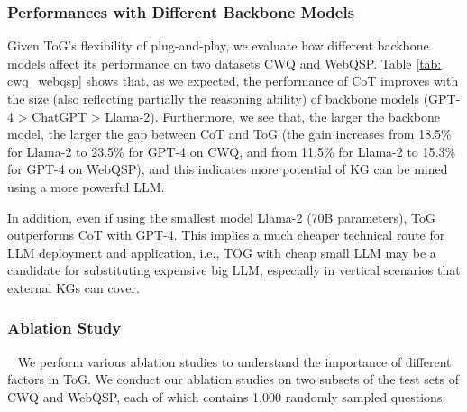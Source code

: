 \documentclass{article} %
\begin{document}

\subsubsection{Performances with Different Backbone Models}
\label{sec:backbone}
Given ToG's flexibility of plug-and-play, we evaluate how different backbone models affect its performance on two datasets CWQ and WebQSP. Table \ref{tab: cwq_webqsp} shows that, as we expected, the performance of CoT improves with the size (also reflecting partially the reasoning ability) of backbone models (GPT-4 > ChatGPT > Llama-2). Furthermore, we see that, the larger the backbone model, the larger the gap between CoT and ToG (the gain increases from 18.5\% for Llama-2 to 23.5\% for GPT-4 on CWQ, and from 11.5\% for Llama-2 to 15.3\% for GPT-4 on WebQSP), and this indicates more potential of KG can be mined using a more powerful LLM.  

In addition, even if using the smallest model Llama-2 (70B parameters), ToG outperforms CoT with GPT-4.
This implies a much cheaper technical route for LLM deployment and application, i.e., TOG with cheap small LLM may be a candidate for substituting expensive big LLM, especially in vertical scenarios that external KGs can cover. 



\subsubsection{Ablation Study}~\label{sec:ablation1}
We perform various ablation studies to understand the importance of different factors in ToG. 
We conduct our ablation studies on two subsets of the test sets of CWQ and WebQSP, each of which contains 1,000 randomly sampled questions.
\end{document}
